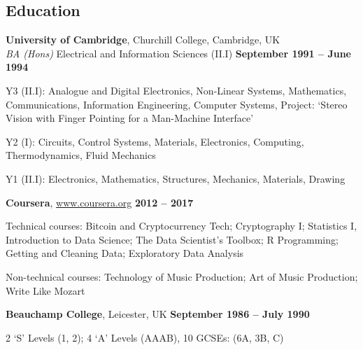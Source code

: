 \documentclass[line]{resume}
\begin{document}
\begin{resume}
    \section{\mysidestyle Education}

    \textbf{University of Cambridge}, Churchill College, Cambridge, UK \vspace{2mm}\\\vspace{1mm}%
    \textsl{BA (Hons)} Electrical and Information Sciences (II.I)\hfill \textbf{ September 1991 -- June 1994}\vspace{-3mm}\\\vspace{-1mm}%
    \begin{list2}
        \item Y3 (II.I): Analogue and Digital Electronics, Non-Linear Systems,
            Mathematics, Communications, Information Engineering, Computer Systems, Project: `Stereo Vision with Finger
            Pointing for a Man-Machine Interface'
        \item Y2 (I): Circuits, Control Systems, Materials, Electronics, Computing, Thermodynamics, Fluid Mechanics
        \item Y1 (II.I): Electronics, Mathematics, Structures, Mechanics, Materials,  Drawing
    \end{list2}\vspace{-1.5mm}

    \textbf{Coursera}, \url{www.coursera.org}\hfill \textbf{ 2012 -- 2017}\vspace{-3mm}\\\vspace{-1mm}%
    \begin{list2}
        \item Technical courses: Bitcoin and Cryptocurrency Tech; Cryptography I; Statistics I, Introduction to Data
              Science; The Data Scientist's Toolbox; R Programming; Getting and Cleaning Data; Exploratory Data Analysis
        \item Non-technical courses: Technology of Music Production; Art of Music Production; Write Like Mozart
    \end{list2}\vspace{-1.5mm}

    \textbf{Beauchamp College}, Leicester, UK\hfill \textbf{ September 1986 -- July 1990}\vspace{-3mm}\\\vspace{-1mm}%
    \begin{list2}
        \item 2 `S' Levels (1, 2); 4 `A' Levels (AAAB), 10 GCSEs: (6A, 3B, C)
    \end{list2}\vspace{-1.5mm}


\end{resume}
\end{document}
